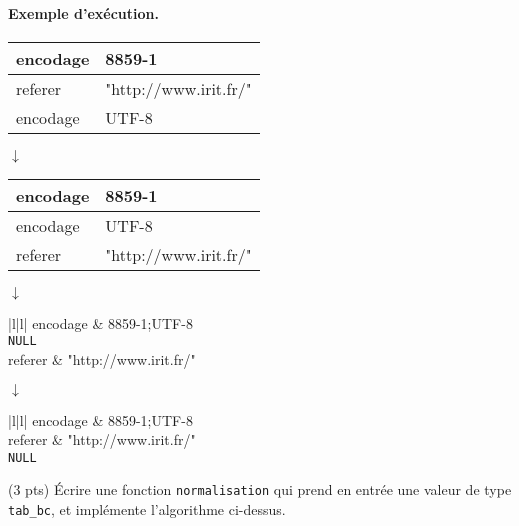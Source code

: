 \paragraph{Exemple d'ex{\'e}cution.}
\begin{center}
  \begin{tabular}[c]{|l|l|}\hline
    encodage & 8859-1\\ \hline
    referer & "http://www.irit.fr/"\\ \hline
    encodage & UTF-8\\ \hline
  \end{tabular}

  \vspace*{1em}

  $\downarrow$ 

  \vspace*{1em}

  \begin{tabular}[c]{|l|l|}\hline
    encodage & 8859-1\\ \hline
    encodage & UTF-8\\ \hline
    referer & "http://www.irit.fr/"\\ \hline
  \end{tabular}

  \vspace*{1em}
  $\downarrow$ 

  \vspace*{1em}

  \begin{tabular}[c]{|l|l|}\hline
    encodage & 8859-1;UTF-8\\ \hline
     {\texttt{NULL}} \\ \hline
    referer & "http://www.irit.fr/"\\ \hline
  \end{tabular}

  \vspace*{1em}

  $\downarrow$ 

  \vspace*{1em}

  \begin{tabular}[c]{|l|l|}\hline
    encodage & 8859-1;UTF-8\\ \hline
    referer & "http://www.irit.fr/"\\ \hline
     {\texttt{NULL}} \\ \hline
  \end{tabular}
\end{center}

\question (3 pts) {\'E}crire une fonction \texttt{normalisation} qui prend
en entr{\'e}e une valeur de type \texttt{tab\_bc}, et impl{\'e}mente
l'algorithme ci-dessus.

